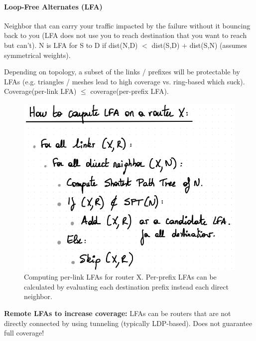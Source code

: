 \paragraph{Loop-Free Alternates (LFA)}
Neighbor that can carry your traffic impacted by the failure without it bouncing back to you (LFA does not use you to reach destination that you want to reach but can't). N is LFA for S to D if dist(N,D) $<$ dist(S,D) $+$ dist(S,N) (assumes symmetrical weights).

Depending on topology, a subset of the links / prefixes will be protectable by LFAs (e.g. triangles / meshes lead to high coverage vs. ring-based which suck). Coverage(per-link LFA) $\leq$ coverage(per-prefix LFA).


\begin{figure}[h]
	\centering
	\includegraphics[scale=0.5]{images/4-lfa.PNG}
	\caption{Computing per-link LFAs for router X. Per-prefix LFAs can be calculated by evaluating each destination prefix instead each direct neighbor.}
	\label{fig:routing}
\end{figure}


\textbf{Remote LFAs to increase coverage:} LFAs can be routers that are not directly connected by using tunneling (typically LDP-based). Does not guarantee full coverage!

